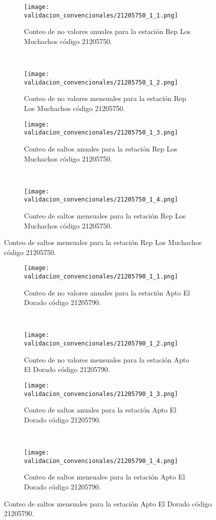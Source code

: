 \begin{figure}[H]\ContinuedFloat
\centering
	\begin{subfigure}[normla]{0.4\textwidth}
	\texttt{[image: validacion\_convencionales/21205750\_1\_1.png]}
		\caption{Conteo de no valores anuales para la estación Rep Los Muchachos código 21205750.}
		\label{subfig:a1}
		\end{subfigure}
		~
    \begin{subfigure}[normla]{0.4\textwidth}
	\texttt{[image: validacion\_convencionales/21205750\_1\_2.png]}
		\caption{Conteo de no valores mensuales para la estación Rep Los Muchachos código 21205750.}
		\label{subfig:a2}
		\end{subfigure}
		
    \begin{subfigure}[normla]{0.4\textwidth}
	\texttt{[image: validacion\_convencionales/21205750\_1\_3.png]}
		\caption{Conteo de saltos anuales para la estación Rep Los Muchachos código 21205750.}
		\label{subfig:a1}
		\end{subfigure}
		~
    \begin{subfigure}[normla]{0.4\textwidth}
	\texttt{[image: validacion\_convencionales/21205750\_1\_4.png]}
		\caption{Conteo de saltos mensuales para la estación Rep Los Muchachos código 21205750.}
		\label{subfig:a2}
		\end{subfigure}

	
\end{figure}
           
\begin{figure}[H]\ContinuedFloat
\centering
	\begin{subfigure}[normla]{0.4\textwidth}
	\texttt{[image: validacion\_convencionales/21205790\_1\_1.png]}
		\caption{Conteo de no valores anuales para la estación Apto El Dorado código 21205790.}
		\label{subfig:a1}
		\end{subfigure}
		~
    \begin{subfigure}[normla]{0.4\textwidth}
	\texttt{[image: validacion\_convencionales/21205790\_1\_2.png]}
		\caption{Conteo de no valores mensuales para la estación Apto El Dorado código 21205790.}
		\label{subfig:a2}
		\end{subfigure}
		
    \begin{subfigure}[normla]{0.4\textwidth}
	\texttt{[image: validacion\_convencionales/21205790\_1\_3.png]}
		\caption{Conteo de saltos anuales para la estación Apto El Dorado código 21205790.}
		\label{subfig:a1}
		\end{subfigure}
		~
    \begin{subfigure}[normla]{0.4\textwidth}
	\texttt{[image: validacion\_convencionales/21205790\_1\_4.png]}
		\caption{Conteo de saltos mensuales para la estación Apto El Dorado código 21205790.}
		\label{subfig:a2}
		\end{subfigure}

	
\end{figure}
           
